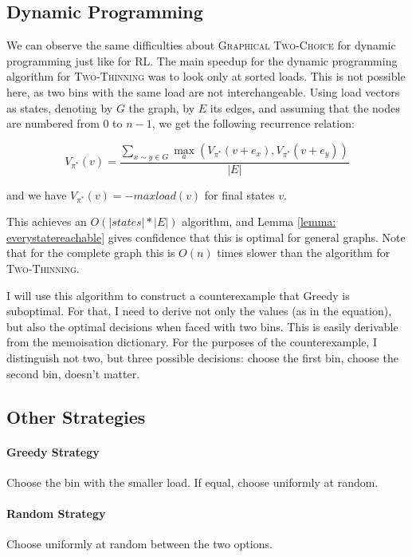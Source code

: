 \subsection{Dynamic Programming}


We can observe the same difficulties about \textsc{Graphical Two-Choice} for dynamic programming just like for RL. The main speedup for the dynamic programming algorithm for \textsc{Two-Thinning} was to look only at sorted loads. This is not possible here, as two bins with the same load are not interchangeable. Using load vectors as states, denoting by $G$ the graph, by $E$ its edges, and assuming that the nodes are numbered from $0$ to $n-1$, we get the following recurrence relation:


\begin{equation} \label{eq:graphicaltwochoice-dynamicprogramming}
    V_{\pi^*}(v) = \frac{\sum_{x\sim y \in G}\max_a (V_{\pi^*}(v+e_x), V_{\pi^*}(v+e_y))}{|E|}
\end{equation}


and we have $V_{\pi^*}(v)=-maxload(v)$ for final states $v$.

This achieves an $O(|states|*|E|)$ algorithm, and Lemma \ref{lemma: everystatereachable} gives confidence that this is optimal for general graphs. Note that for the complete graph this is $O(n)$ times slower than the algorithm for \textsc{Two-Thinning}.

I will use this algorithm to construct a counterexample that Greedy is suboptimal. For that, I need to derive not only the values (as in the equation), but also the optimal decisions when faced with two bins. This is easily derivable from the memoisation dictionary. For the purposes of the counterexample, I distinguish not two, but three possible decisions: choose the first bin, choose the second bin, doesn't matter.


\subsection{Other Strategies} \label{graphical-otherstrategies}


\paragraph{Greedy Strategy} Choose the bin with the smaller load. If equal, choose uniformly at random.


\paragraph{Random Strategy} Choose uniformly at random between the two options.



